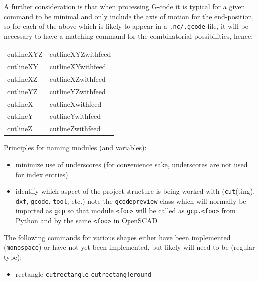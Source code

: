 \documentclass{ltxdoc}
\begin{document}
A further consideration is that when processing G-code it is typical for a given command to be minimal and only include the axis of motion for the end-position, so for each of the above which is likely to appear in a \verb|.nc/.gcode| file, it will be necessary to have a matching command for the combinatorial possibilities, hence:

\begin{center}
\noindent\begin{tabular}{ll}\toprule
cutlineXYZ  & cutlineXYZwithfeed\\
cutlineXY   & cutlineXYwithfeed\\
cutlineXZ   & cutlineXZwithfeed\\
cutlineYZ   & cutlineYZwithfeed\\
cutlineX    & cutlineXwithfeed\\
cutlineY    & cutlineYwithfeed\\
cutlineZ    & cutlineZwithfeed\\\bottomrule
\end{tabular}
\end{center}

Principles for naming modules (and variables):

\begin{itemize}
\item minimize use of underscores (for convenience sake, underscores are not used for index entries)
\item identify which aspect of the project structure is being worked with (\texttt{cut}(ting), 
      \texttt{dxf}, \texttt{gcode}, \texttt{tool}, etc.) note the \verb|gcodepreview| class which will 
      normally be imported as \verb|gcp| so that module \verb|<foo>| will be called as
      \verb|gcp.<foo>| from Python and by the same \verb|<foo>| in OpenSCAD
\end{itemize}


The following commands for various shapes either have been implemented (\verb|monospace|) or have not yet been implemented, but likely will need to be (regular type):

\begin{itemize}
\item rectangle
\subitem \texttt{cutrectangle}
\subitem \texttt{cutrectangleround}
\end{itemize}
\end{document}
